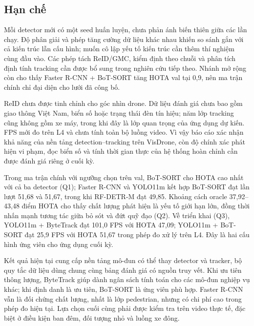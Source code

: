 \documentclass[fontsize=13pt,a4paper,oneside,parskip=false,numbers=noenddot,bibliography=totoc]{scrreprt}
\begin{document}
\subsection{Hạn chế}
\label{sec:han-che}
Mỗi detector mới có một seed huấn luyện, chưa phản ánh biến thiên giữa các lần chạy. Độ phân giải và phép tăng cường dữ liệu khác nhau khiến so sánh gắn với cả kiến trúc lẫn cấu hình; muốn cô lập yếu tố kiến trúc cần thêm thí nghiệm cùng đầu vào. Các phép tách ReID/GMC, kiểm định theo chuỗi và phân tích định tính tracking cần được bổ sung trong nghiên cứu tiếp theo. Nhánh mở rộng còn cho thấy Faster R-CNN + BoT-SORT tăng HOTA val tại 0,9, nên ma trận chính chỉ đại diện cho lưới đã công bố.

ReID chưa được tinh chỉnh cho góc nhìn drone. Dữ liệu đánh giá chưa bao gồm giao thông Việt Nam, biển số hoặc trạng thái đèn tín hiệu; năm lớp tracking cũng không gồm xe máy, trong khi đây là lớp quan trọng của ứng dụng dự kiến. FPS mới đo trên L4 và chưa tính toàn bộ luồng video. Vì vậy báo cáo xác nhận khả năng của nền tảng detection--tracking trên VisDrone, còn độ chính xác phát hiện vi phạm, đọc biển số và tính thời gian thực của hệ thống hoàn chỉnh cần được đánh giá riêng ở cuối kỳ.

\label{chap:ket-luan}
\renewcommand{\thetable}{KL.\arabic{table}}
\renewcommand{\thefigure}{KL.\arabic{figure}}
\renewcommand{\theHtable}{ketluan.\arabic{table}}
\renewcommand{\theHfigure}{ketluan.\arabic{figure}}

Trong ma trận chính với ngưỡng chọn trên val, BoT-SORT cho HOTA cao nhất với cả ba detector (Q1); Faster R-CNN và YOLO11m kết hợp BoT-SORT đạt lần lượt 51,68 và 51,67, trong khi RF-DETR-M đạt 49,85. Khoảng cách oracle 37,92--43,48 điểm HOTA cho thấy chất lượng phát hiện là yếu tố giới hạn lớn, đồng thời nhấn mạnh tương tác giữa bỏ sót và đứt quỹ đạo (Q2). Về triển khai (Q3), YOLO11m + ByteTrack đạt 101,0 FPS với HOTA 47,09; YOLO11m + BoT-SORT đạt 25,9 FPS với HOTA 51,67 trong phép đo xử lý trên L4. Đây là hai cấu hình ứng viên cho ứng dụng cuối kỳ.

Kết quả hiện tại cung cấp nền tảng mô-đun có thể thay detector và tracker, bộ quy tắc dữ liệu dùng chung cùng bảng đánh giá có nguồn truy vết. Khi ưu tiên thông lượng, ByteTrack giúp dành ngân sách tính toán cho các mô-đun nghiệp vụ khác; khi định danh là ưu tiên, BoT-SORT là ứng viên phù hợp. Faster R-CNN vẫn là đối chứng chất lượng, nhất là lớp pedestrian, nhưng có chi phí cao trong phép đo hiện tại. Lựa chọn cuối cùng phải được kiểm tra trên video thực tế, đặc biệt ở điều kiện ban đêm, đối tượng nhỏ và luồng xe đông.
\end{document}
